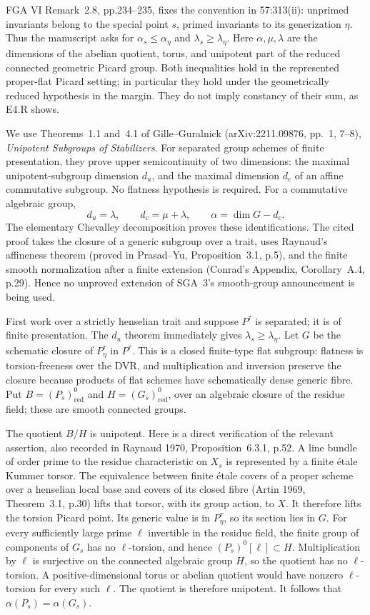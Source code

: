 FGA VI Remark~2.8, pp.234--235, fixes the convention in 57:313(ii):
unprimed invariants belong to the special point $s$, primed invariants to
its generization $\eta$. Thus the manuscript asks for
$\alpha_s\le\alpha_\eta$ and $\lambda_s\ge\lambda_\eta$.
Here $\alpha,\mu,\lambda$ are the dimensions of the abelian quotient,
torus, and unipotent part of the reduced connected geometric Picard group.
Both inequalities hold in the represented proper-flat Picard setting;
in particular they hold under the geometrically reduced hypothesis in
the margin. They do not imply constancy of their sum, as E4.R shows.

We use Theorems~1.1 and~4.1 of Gille--Guralnick
(arXiv:2211.09876, pp.~1, 7--8), \emph{Unipotent Subgroups of
Stabilizers}. For separated group schemes of finite presentation,
they prove upper semicontinuity of two dimensions: the maximal
unipotent-subgroup dimension $d_u$, and the maximal dimension $d_c$
of an affine commutative subgroup. No flatness hypothesis is required. For a commutative algebraic group,
\[
 d_u=\lambda,\qquad d_c=\mu+\lambda,\qquad
 \alpha=\dim G-d_c.                                  \tag{E4.rank.1}
\]
The elementary Chevalley decomposition proves these identifications.
The cited proof takes the closure of a generic subgroup over a trait,
uses Raynaud's affineness theorem (proved in Prasad--Yu, Proposition~3.1,
p.5), and the finite smooth normalization after a finite extension
(Conrad's Appendix, Corollary~A.4, p.29). Hence no unproved extension
of SGA~3's smooth-group announcement is being used.

First work over a strictly henselian trait and suppose $P^\tau$ is
separated; it is of finite presentation. The $d_u$ theorem immediately
gives $\lambda_s\ge\lambda_\eta$. Let $G$ be the schematic closure of
$P^\tau_\eta$ in $P^\tau$. This is a closed finite-type flat subgroup:
flatness is torsion-freeness over the DVR, and multiplication and inversion
preserve the closure because products of flat schemes have schematically
dense generic fibre. Put $B=(P_s)^0_{\mathrm{red}}$ and
$H=(G_s)^0_{\mathrm{red}}$, over an algebraic closure of the residue field;
these are smooth connected groups.

The quotient $B/H$ is unipotent.
Here is a direct verification of the relevant assertion, also recorded
in Raynaud 1970, Proposition~6.3.1, p.52. A line bundle of order prime to
the residue characteristic on $X_s$ is represented by a finite \'etale
Kummer torsor. The equivalence between finite \'etale covers of a proper
scheme over a henselian local base and covers of its closed fibre
(Artin 1969, Theorem~3.1, p.30) lifts that torsor, with its group action,
to $X$. It therefore lifts the torsion Picard point. Its generic value is
in $P^\tau_\eta$, so its section lies in $G$. For every sufficiently large
prime $\ell$ invertible in the residue field, the finite group of
components of $G_s$ has no $\ell$-torsion, and hence
$(P_s)^0[\ell]\subset H$. Multiplication by $\ell$ is surjective on the
connected algebraic group $H$, so the quotient has no $\ell$-torsion.
A positive-dimensional torus or abelian quotient would have nonzero
$\ell$-torsion for every such $\ell$. The quotient is therefore unipotent.
It follows that $\alpha(P_s)=\alpha(G_s)$.

